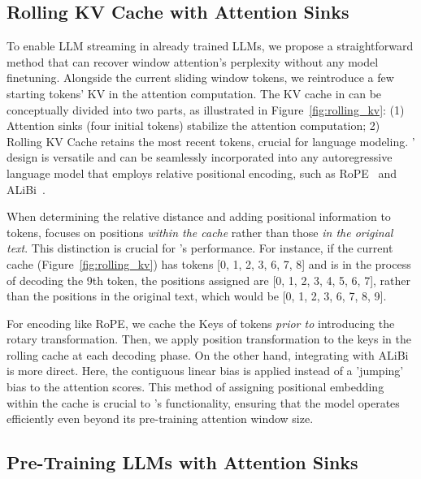 \vspace{-1em}
\subsection{Rolling KV Cache with Attention Sinks}

To enable LLM streaming in already trained LLMs, we propose a straightforward method that can recover window attention's perplexity without any model finetuning. Alongside the current sliding window tokens, we reintroduce a few starting tokens' KV in the attention computation. The KV cache in \method can be conceptually divided into two parts, as illustrated in Figure~\ref{fig:rolling_kv}: (1) Attention sinks (four initial tokens) stabilize the attention computation; 2) Rolling KV Cache retains the most recent tokens, crucial for language modeling. \method' design is versatile and can be seamlessly incorporated into any autoregressive language model that employs relative positional encoding, such as RoPE~\citep{su2021roformer} and ALiBi~\citep{alibi}.

When determining the relative distance and adding positional information to tokens, \method focuses on positions \emph{within the cache} rather than those \emph{in the original text}. This distinction is crucial for \method's performance. For instance, if the current cache (Figure~\ref{fig:rolling_kv}) has tokens [0, 1, 2, 3, 6, 7, 8] and is in the process of decoding the 9th token, the positions assigned are [0, 1, 2, 3, 4, 5, 6, 7], rather than the positions in the original text, which would be [0, 1, 2, 3, 6, 7, 8, 9].

For encoding like RoPE, we cache the Keys of tokens \emph{prior to} introducing the rotary transformation. Then, we apply position transformation to the keys in the rolling cache at each decoding phase. On the other hand, integrating with ALiBi is more direct. Here, the contiguous linear bias is applied instead of a 'jumping' bias to the attention scores. This method of assigning positional embedding within the cache is crucial to \method's functionality, ensuring that the model operates efficiently even beyond its pre-training attention window size.

\subsection{Pre-Training LLMs with Attention Sinks}
\label{sec:pretrain-fix}


